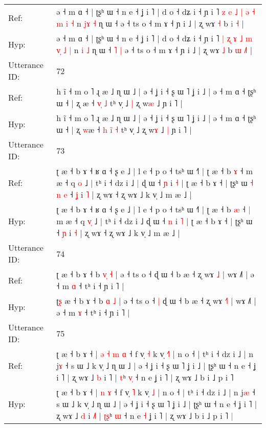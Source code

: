 \documentclass[10pt]{article}
\DeclareRobustCommand{\hl}[1]{{\textcolor{red}{#1}}}
\begin{document}
\begin{longtable}{ll}
Ref: & ə ˧ m ɑ ˧ | ʈʂʰ ɯ ˧ n e ˧ ʝ i ˥ | d o ˧ dʑ i ˧ ɲ i ˥ \hl{z} \hl{e} \hl{˩} \hl{|} \hl{ə} \hl{˧}\hl{ }\hl{m} \hl{i} \hl{˧} n \hl{j}\hl{ɤ} \hl{˧} ɳ ɯ ˧\hl{}\hl{}\hl{}\hl{} ə ˧ ts o ˧ m ɤ ˧ ɲ i ˩ | ʐ wɤ \hl{˧} b \hl{i} \hl{}\hl{˧} |
 \\
Hyp: & ə ˧ m ɑ ˧ | ʈʂʰ ɯ ˧ n e ˧ ʝ i ˥ | d o ˧ dʑ i ˧ ɲ i ˥ \hl{|} \hl{ʐ} \hl{ɤ} \hl{˩} \hl{m} \hl{}\hl{v}\hl{̩} \hl{˩} \hl{|} n \hl{}\hl{i} \hl{˩} ɳ ɯ ˧\hl{ }\hl{˥}\hl{ }\hl{|} ə ˧ ts o ˧ m ɤ ˧ ɲ i ˩ | ʐ wɤ \hl{˩} b \hl{ɯ} \hl{˩}\hl{˥} |
 \\
\midrule
Utterance ID: & 72 \\
Ref: & h ĩ ˧ m o ˥ ɻ æ ˩ ɳ ɯ ˩ | ə ˧ ʝ i ˧ ʂ ɯ ˥ ʝ i ˩ | ə ˧ m ɑ ˧ ʈʂʰ ɯ ˧ | ʐ \hl{}æ ˧\hl{}\hl{} \hl{v}\hl{̩} \hl{˩} tʰ v̩ ˩\hl{ }\hl{|} ʐ w\hl{æ} ˩\hl{}\hl{} ɲ i ˥ |
 \\
Hyp: & h ĩ ˧ m o ˥ ɻ æ ˩ ɳ ɯ ˩ | ə ˧ ʝ i ˧ ʂ ɯ ˥ ʝ i ˩ | ə ˧ m ɑ ˧ ʈʂʰ ɯ ˧ | ʐ \hl{w}æ ˧\hl{ }\hl{h} \hl{i}\hl{̃} \hl{˧} tʰ v̩ ˩\hl{}\hl{} ʐ w\hl{ɤ} ˩\hl{ }\hl{|} ɲ i ˥ |
 \\
\midrule
Utterance ID: & 73 \\
Ref: & ʈ æ ˧ b ɤ ˧ ʁ ɑ ˧ ʂ e ˩ | l e ˧ p o ˧ tsʰ ɯ ˧˥ | ʈ æ ˧ b \hl{ɤ} ˧\hl{}\hl{} m æ ˧ q \hl{}\hl{o} ˩ | tʰ i ˧ dz i ˩\hl{ }\hl{|} ɖ ɯ ˧ \hl{ɲ} i \hl{˧} | ʈ æ ˧ b ɤ ˧ | ʈʂʰ ɯ\hl{ }\hl{˧}\hl{ }\hl{n}\hl{ }\hl{e} ˧ \hl{ʝ} i \hl{˥} | ʐ wɤ ˧ ʐ wɤ ˩ k v̩ ˩ m æ ˩ |
 \\
Hyp: & ʈ æ ˧ b ɤ ˧ ʁ ɑ ˧ ʂ e ˩ | l e ˧ p o ˧ tsʰ ɯ ˧˥ | ʈ æ ˧ b \hl{æ} ˧\hl{ }\hl{|} m æ ˧ q \hl{v}\hl{̩} ˩ | tʰ i ˧ dz i ˩\hl{}\hl{} ɖ ɯ ˧ \hl{n} i \hl{˥} | ʈ æ ˧ b ɤ ˧ | ʈʂʰ ɯ\hl{}\hl{}\hl{}\hl{}\hl{}\hl{} ˧ \hl{ɲ} i \hl{˧} | ʐ wɤ ˧ ʐ wɤ ˩ k v̩ ˩ m æ ˩ |
 \\
\midrule
Utterance ID: & 74 \\
Ref: & ʈ\hl{} æ ˧ b ɤ ˧ b \hl{v}\hl{̩} \hl{˧} | ə ˧ ts o ˧\hl{}\hl{} ɖ ɯ ˧ b æ ˧ ʐ wɤ \hl{}\hl{˩} | wɤ ˩˥ | ə ˧ m \hl{ɑ} ˧ tʰ i ˧ ɲ i ˥ |
 \\
Hyp: & ʈ\hl{ʂ} æ ˧ b ɤ ˧ b \hl{}\hl{ɑ} \hl{˩} | ə ˧ ts o ˧\hl{ }\hl{|} ɖ ɯ ˧ b æ ˧ ʐ wɤ \hl{˧}\hl{˥} | wɤ ˩˥ | ə ˧ m \hl{ɤ} ˧ tʰ i ˧ ɲ i ˥ |
 \\
\midrule
Utterance ID: & 75 \\
Ref: & ʈ æ ˧ b ɤ ˧ |\hl{ }\hl{ə}\hl{ }\hl{˧} \hl{m} \hl{ɑ} ˧ f v̩ \hl{˧} k v̩ \hl{˧}\hl{˥} | n o ˧ | tʰ i ˧ dz i ˩ | n j\hl{ɤ} ˧ s ɯ ˩ k v̩ ˩ ɳ ɯ ˩ | ə ˧ ʝ i ˧ ʂ ɯ ˥ ʝ i ˩ | ʈʂʰ ɯ ˧ n e ˧ ʝ i ˥ | ʐ wɤ ˩ \hl{b} i \hl{}˥ | \hl{}\hl{t}ʰ \hl{v}\hl{̩} ˧ n e\hl{}\hl{} ʝ i ˥ | ʐ wɤ ˩ b i ˩ p i ˥\hl{}\hl{}
 \\
Hyp: & ʈ æ ˧ b ɤ ˧ |\hl{}\hl{}\hl{}\hl{} \hl{n} \hl{ɤ} ˧ f v̩ \hl{˥} k v̩ \hl{}\hl{˩} | n o ˧ | tʰ i ˧ dz i ˩ | n j\hl{æ} ˧ s ɯ ˩ k v̩ ˩ ɳ ɯ ˩ | ə ˧ ʝ i ˧ ʂ ɯ ˥ ʝ i ˩ | ʈʂʰ ɯ ˧ n e ˧ ʝ i ˥ | ʐ wɤ ˩ \hl{d} i \hl{˩}˥ | \hl{ʈ}\hl{ʂ}ʰ \hl{}\hl{ɯ} ˧ n e\hl{ }\hl{˧} ʝ i ˥ | ʐ wɤ ˩ b i ˩ p i ˥\hl{ }\hl{|}

\end{longtable}
\end{document}
